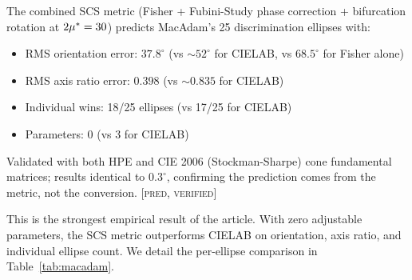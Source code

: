 \documentclass[12pt,a4paper]{article}
\begin{document}
\begin{predictionbox}
The combined SCS metric (Fisher + Fubini-Study phase correction +
bifurcation rotation at $2{\mu^{*}} = 30$) predicts MacAdam's 25
discrimination ellipses with:
\begin{itemize}[nosep]
\item RMS orientation error: $37.8^\circ$ (vs $\sim\!52^\circ$ for
  CIELAB, vs $68.5^\circ$ for Fisher alone)
\item RMS axis ratio error: $0.398$ (vs $\sim\!0.835$ for CIELAB)
\item Individual wins: 18/25 ellipses (vs 17/25 for CIELAB)
\item Parameters: 0 (vs 3 for CIELAB)
\end{itemize}
Validated with both HPE and CIE 2006 (Stockman-Sharpe) cone fundamental
matrices; results identical to $0.3^\circ$, confirming the prediction
comes from the metric, not the conversion. \textsc{[pred, verified]}
\end{predictionbox}

This is the strongest empirical result of the article. With zero
adjustable parameters, the SCS metric outperforms CIELAB on
orientation, axis ratio, and individual ellipse count. We detail
the per-ellipse comparison in Table~\ref{tab:macadam}.
\end{document}
